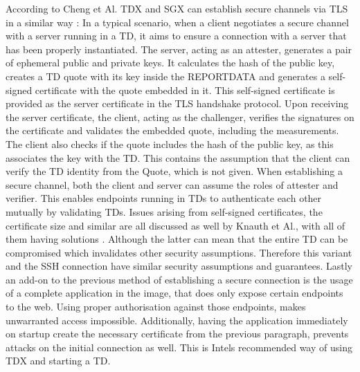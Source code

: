 According to Cheng et Al. \Gls{TDX} and \Gls{SGX} can establish secure channels via TLS in a similar way \cite{cheng_intel_2023}:
In a typical scenario, when a client negotiates a secure channel with a server running in a TD, it aims to ensure a connection with a server that has been properly instantiated. The server, acting as an attester, generates a pair of ephemeral public and private keys. It calculates the hash of the public key, creates a TD quote with its key inside the REPORTDATA and generates a self-signed certificate with the quote embedded in it. This self-signed certificate is provided as the server certificate in the TLS handshake protocol. Upon receiving the server certificate, the client, acting as the challenger, verifies the signatures on the certificate and validates the embedded quote, including the measurements. The client also checks if the quote includes the hash of the public key, as this associates the key with the TD. This contains the assumption that the client can verify the TD identity from the Quote, which is not given. When establishing a secure channel, both the client and server can assume the roles of attester and verifier. This enables endpoints running in TDs to authenticate each other mutually by validating TDs. Issues arising from self-signed certificates, the certificate size and similar are all discussed as well by Knauth et Al., with all of them having solutions \cite{knauth_integrating_2019}. Although the latter can mean that the entire TD can be compromised which invalidates other security assumptions. Therefore this variant and the SSH connection have similar security assumptions and guarantees.
Lastly an add-on to the previous method of establishing a secure connection is the usage of a complete application in the image, that does only expose certain endpoints to the web. Using proper authorisation against those endpoints, makes unwarranted access impossible. Additionally, having the application immediately on startup create the necessary certificate from the previous paragraph, prevents attacks on the initial connection as well. This is Intels recommended way of using \Gls{TDX} and starting a TD. 


